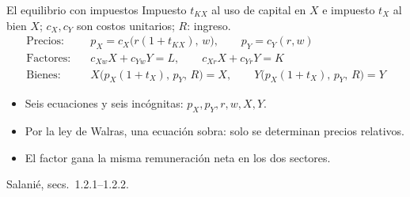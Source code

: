 \documentclass[aspectratio=169,11pt]{beamer}
\newcommand{\fuente}[1]{\par\vfill{\small\color{cGris}#1\par}}
\begin{document}
\begin{frame}{El equilibrio con impuestos}
  Impuesto $t_{KX}$ al uso de capital en $X$ e impuesto $t_X$ al bien $X$; $c_X, c_Y$ son costos unitarios; $R$: ingreso.
  \begin{align*}
    \text{Precios:}\quad & p_X = c_X\big(r(1+t_{KX}),\,w\big), \qquad p_Y = c_Y(r,w)\\
    \text{Factores:}\quad & c_{Xw}X + c_{Yw}Y = L, \qquad c_{Xr}X + c_{Yr}Y = K\\
    \text{Bienes:}\quad & X\big(p_X(1+t_X),\,p_Y,\,R\big) = X, \qquad Y\big(p_X(1+t_X),\,p_Y,\,R\big) = Y
  \end{align*}
  \pause
  \begin{itemize}
    \item Seis ecuaciones y seis incógnitas: $p_X, p_Y, r, w, X, Y$.
    \item Por la ley de Walras, una ecuación sobra: solo se determinan precios relativos.
    \item El factor gana la misma remuneración neta en los dos sectores.
  \end{itemize}
  \fuente{Salanié, secs.~1.2.1–1.2.2.}
\end{frame}
\end{document}
